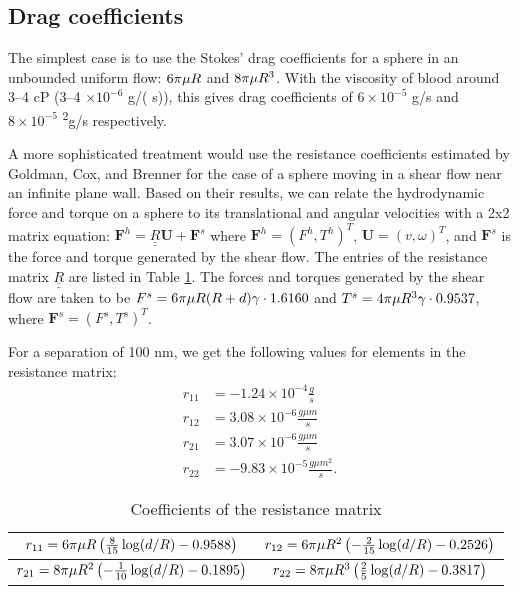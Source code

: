 \documentclass{article}
\begin{document}
\subsection{Drag coefficients}
\label{sec:drag-coefficients}

The simplest case is to use the Stokes' drag coefficients for a sphere
in an unbounded uniform flow: $6\pi\mu R$ and
$8\pi\mu R^3$. With the  viscosity of blood around 3--4
cP (3--4 $\times 10^{-6}$ g/( s)), this gives drag
coefficients of $6 \times 10^{-5}$ g/s and $8 \times 10^{-5}$
\textsuperscript{2}g/s respectively.

A more sophisticated treatment would use the resistance coefficients
estimated by Goldman, Cox, and Brenner
\cite{Goldman1967a,Goldman1967b} for the case of a sphere moving in a
shear flow near an infinite plane wall. Based on their results, we can
relate the hydrodynamic force and torque on a sphere to its
translational and angular velocities with a 2x2 matrix equation:
$\mathbf{F}^h = \underline{\underline{R}} \mathbf{U} + \mathbf{F}^s$ where
$\mathbf{F}^h = (F^h, T^h)^T$, $\mathbf{U} = (v, \omega)^T$, and $\mathbf{F}^s$
is the force and torque generated by the shear flow. The entries of
the resistance matrix $\underline{\underline{R}}$ are listed in Table
\ref{tab:resistance-coefficients}. The forces and torques generated by
the shear flow are taken to be $F^s = 6 \pi \mu R
(R + d) \gamma \cdot 1.6160$ and $T^s = 4 \pi
\mu R^3 \gamma \cdot 0.9537$, where $\mathbf{F}^s = (F^s,
T^s)^T$.

For a separation of 100 nm, we get the following values for elements
in the resistance matrix:
\begin{align*}
  r_{11} &= -1.24 \times 10^{-4} \frac{g}{s} \\
  r_{12} &= 3.08 \times 10^{-6} \frac{g \mu m}{s} \\
  r_{21} &= 3.07 \times 10^{-6} \frac{g \mu m}{s} \\
  r_{22} &= -9.83 \times 10^{-5} \frac{g \mu m^2}{s}.
\end{align*}

\begin{table}
  \centering
  \begin{tabular}{c|c}
    $r_{11} = 6 \pi \mu R
    \left(\frac{8}{15}\log(d/R) - 0.9588\right)$
  & $r_{12} = 6 \pi \mu R^2
    \left(-\frac{2}{15}\log(d/R) - 0.2526\right)$ \\ 
    \hline
    $r_{21} = 8 \pi \mu R^2
    \left(-\frac{1}{10}\log(d/R) - 0.1895\right)$
  & $r_{22} = 8 \pi \mu R^3
    \left(\frac{2}{5}\log(d/R) - 0.3817\right)$
  \end{tabular}
  \caption{Coefficients of the resistance matrix}
  \label{tab:resistance-coefficients}
\end{table}
\end{document}
